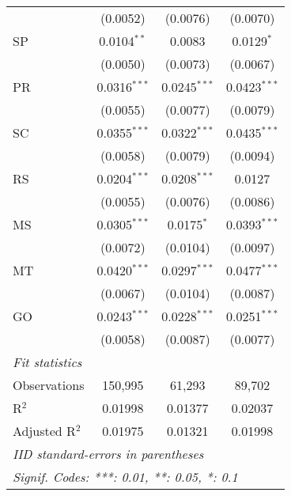 \begin{tabular}{lccc}
                   & (0.0052)                & (0.0076)                & (0.0070)\\   
   SP              & 0.0104$^{**}$           & 0.0083                  & 0.0129$^{*}$\\   
                   & (0.0050)                & (0.0073)                & (0.0067)\\   
   PR              & 0.0316$^{***}$          & 0.0245$^{***}$          & 0.0423$^{***}$\\   
                   & (0.0055)                & (0.0077)                & (0.0079)\\   
   SC              & 0.0355$^{***}$          & 0.0322$^{***}$          & 0.0435$^{***}$\\   
                   & (0.0058)                & (0.0079)                & (0.0094)\\   
   RS              & 0.0204$^{***}$          & 0.0208$^{***}$          & 0.0127\\   
                   & (0.0055)                & (0.0076)                & (0.0086)\\   
   MS              & 0.0305$^{***}$          & 0.0175$^{*}$            & 0.0393$^{***}$\\   
                   & (0.0072)                & (0.0104)                & (0.0097)\\   
   MT              & 0.0420$^{***}$          & 0.0297$^{***}$          & 0.0477$^{***}$\\   
                   & (0.0067)                & (0.0104)                & (0.0087)\\   
   GO              & 0.0243$^{***}$          & 0.0228$^{***}$          & 0.0251$^{***}$\\   
                   & (0.0058)                & (0.0087)                & (0.0077)\\   
   \midrule
   \emph{Fit statistics}\\
   Observations    & 150,995                 & 61,293                  & 89,702\\  
   R$^2$           & 0.01998                 & 0.01377                 & 0.02037\\  
   Adjusted R$^2$  & 0.01975                 & 0.01321                 & 0.01998\\  
   \midrule \midrule
   \multicolumn{4}{l}{\emph{IID standard-errors in parentheses}}\\
   \multicolumn{4}{l}{\emph{Signif. Codes: ***: 0.01, **: 0.05, *: 0.1}}\\
\end{tabular}
\par\endgroup



